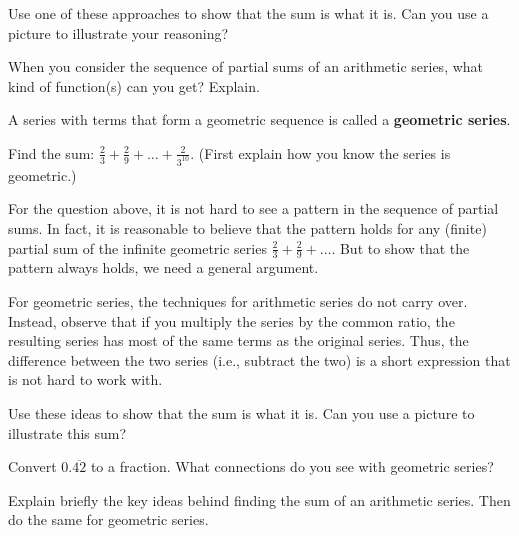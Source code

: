 \begin{question}
Use one of these approaches to show that the sum is what it is.  Can you use a picture to illustrate your reasoning?    
\end{question}
\QM

\begin{question}
When you consider the sequence of partial sums of an arithmetic series, what kind of function(s) can you get?  Explain.  
\end{question} 
\QM

\begin{definition}
A series with terms that form a geometric sequence is called a \textbf{geometric series}.  
\end{definition}

\begin{question}
Find the sum:  $\frac{2}{3}+\frac{2}{9}+\dots+\frac{2}{3^{10}}$.  (First explain how you know the series is geometric.)
\end{question}
\QM

For the question above, it is not hard to see a pattern in the sequence of partial sums.  In fact, it is reasonable to believe that the pattern holds for any (finite) partial sum of the infinite geometric series $\frac{2}{3}+\frac{2}{9}+\dots$.  But to show that the pattern always holds, we need a general argument.  

For geometric series, the techniques for arithmetic series do not carry over.  Instead, observe that if you multiply the series by the common ratio, the resulting series has most of the same terms as the original series.  Thus, the difference between the two series (i.e., subtract the two) is a short expression that is not hard to work with.  

\begin{question}
Use these ideas to show that the sum is what it is.  Can you use a picture to illustrate this sum?    
\end{question}
\QM

\begin{question}
Convert $0.\overline{42}$ to a fraction.  What connections do you see with geometric series?  
\end{question}
\QM

\begin{question}
Explain briefly the key ideas behind finding the sum of an arithmetic series. Then do the same for geometric series.  
\end{question}
\QM


